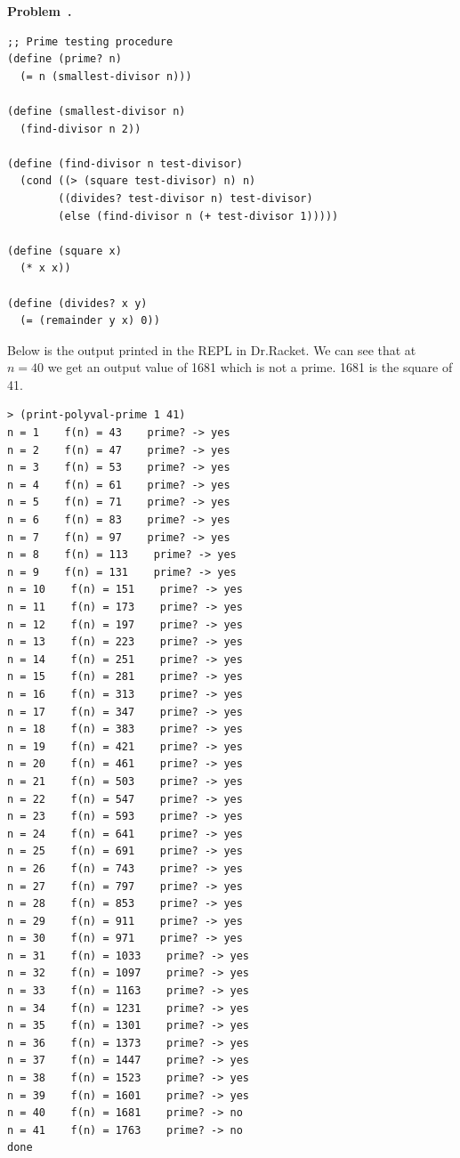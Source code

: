 \documentclass[10pt]{article}
\newcounter{problem}
\newenvironment{problem}[1][]{
  \refstepcounter{problem}
  \par\noindent\textbf{Problem~\theproblem. #1}\par
  \vspace{0.5em}
}{\vspace{1em}}
\begin{document}
\begin{problem}
\begin{lstlisting}
;; Prime testing procedure
(define (prime? n)
  (= n (smallest-divisor n)))

(define (smallest-divisor n)
  (find-divisor n 2))

(define (find-divisor n test-divisor)
  (cond ((> (square test-divisor) n) n)
        ((divides? test-divisor n) test-divisor)
        (else (find-divisor n (+ test-divisor 1)))))

(define (square x)
  (* x x))

(define (divides? x y)
  (= (remainder y x) 0))

\end{lstlisting}

Below is the output printed in the REPL in Dr.Racket. We can see that at $n = 40$ we get an output value of 1681 which is not a prime.
1681 is the square of 41. 

\begin{lstlisting}
> (print-polyval-prime 1 41)
n = 1    f(n) = 43    prime? -> yes
n = 2    f(n) = 47    prime? -> yes
n = 3    f(n) = 53    prime? -> yes
n = 4    f(n) = 61    prime? -> yes
n = 5    f(n) = 71    prime? -> yes
n = 6    f(n) = 83    prime? -> yes
n = 7    f(n) = 97    prime? -> yes
n = 8    f(n) = 113    prime? -> yes
n = 9    f(n) = 131    prime? -> yes
n = 10    f(n) = 151    prime? -> yes
n = 11    f(n) = 173    prime? -> yes
n = 12    f(n) = 197    prime? -> yes
n = 13    f(n) = 223    prime? -> yes
n = 14    f(n) = 251    prime? -> yes
n = 15    f(n) = 281    prime? -> yes
n = 16    f(n) = 313    prime? -> yes
n = 17    f(n) = 347    prime? -> yes
n = 18    f(n) = 383    prime? -> yes
n = 19    f(n) = 421    prime? -> yes
n = 20    f(n) = 461    prime? -> yes
n = 21    f(n) = 503    prime? -> yes
n = 22    f(n) = 547    prime? -> yes
n = 23    f(n) = 593    prime? -> yes
n = 24    f(n) = 641    prime? -> yes
n = 25    f(n) = 691    prime? -> yes
n = 26    f(n) = 743    prime? -> yes
n = 27    f(n) = 797    prime? -> yes
n = 28    f(n) = 853    prime? -> yes
n = 29    f(n) = 911    prime? -> yes
n = 30    f(n) = 971    prime? -> yes
n = 31    f(n) = 1033    prime? -> yes
n = 32    f(n) = 1097    prime? -> yes
n = 33    f(n) = 1163    prime? -> yes
n = 34    f(n) = 1231    prime? -> yes
n = 35    f(n) = 1301    prime? -> yes
n = 36    f(n) = 1373    prime? -> yes
n = 37    f(n) = 1447    prime? -> yes
n = 38    f(n) = 1523    prime? -> yes
n = 39    f(n) = 1601    prime? -> yes
n = 40    f(n) = 1681    prime? -> no
n = 41    f(n) = 1763    prime? -> no
done
\end{lstlisting}
\end{problem}
\end{document}
